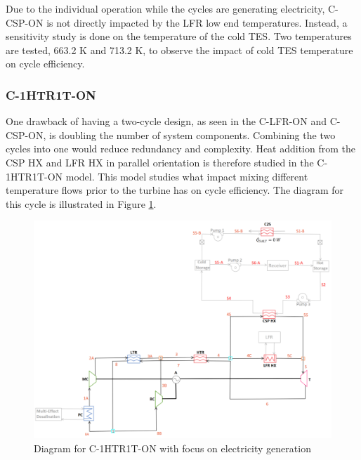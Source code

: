 \begin{paracol}{2}
\linenumbers
\switchcolumn

 Due to the individual operation while the cycles are generating electricity, C-CSP-ON is not directly impacted by the LFR low end temperatures. Instead, a sensitivity study is done on the temperature of the cold TES. Two temperatures are tested, 663.2 K and 713.2 K, to observe the impact of cold TES temperature on cycle efficiency. 


\subsubsection{C-1HTR1T-ON} 

One drawback of having a two-cycle design, as seen in the C-LFR-ON and C-CSP-ON, is doubling the number of system components. Combining the two cycles into one would reduce redundancy and complexity. Heat addition from the CSP HX and LFR HX in parallel orientation is therefore studied in the C-1HTR1T-ON model. This model studies what impact mixing different temperature flows prior to the turbine has on cycle efficiency. The diagram for this cycle is illustrated in Figure \ref{c-1htr1t-on}.


\end{paracol}
\begin{figure}[H] 
    \widefigure
    \includegraphics[width=\linewidth]{Definitions/c-1htr1t-on.pdf}
    \caption{Diagram for C-1HTR1T-ON with focus on electricity generation\label{c-1htr1t-on}}
\end{figure}
